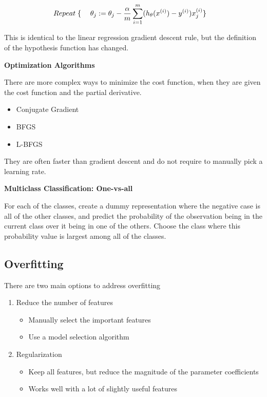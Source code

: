 \documentclass[
]{article}
\begin{document}
\begin{align*} & Repeat \; \lbrace \newline & \; \theta_j := \theta_j - \frac{\alpha}{m} \sum_{i=1}^m (h_\theta(x^{(i)}) - y^{(i)}) x_j^{(i)} \newline & \rbrace \end{align*}

This is identical to the linear regression gradient descent rule, but
the definition of the hypothesis function has changed.

\textbf{Optimization Algorithms}

There are more complex ways to minimize the cost function, when they are
given the cost function and the partial derivative.

\begin{itemize}
\item
  Conjugate Gradient
\item
  BFGS
\item
  L-BFGS
\end{itemize}

They are often faster than gradient descent and do not require to
manually pick a learning rate.

\textbf{Multiclass Classification: One-vs-all}

For each of the classes, create a dummy representation where the
negative case is all of the other classes, and predict the probability
of the observation being in the current class over it being in one of
the others. Choose the class where this probability value is largest
among all of the classes.

\hypertarget{header-n29}{%
\subsection{Overfitting}\label{header-n29}}

There are two main options to address overfitting

\begin{enumerate}
\def\labelenumi{\arabic{enumi}.}
\item
  Reduce the number of features

  \begin{itemize}
  \item
    Manually select the important features
  \item
    Use a model selection algorithm
  \end{itemize}
\item
  Regularization

  \begin{itemize}
  \item
    Keep all features, but reduce the magnitude of the parameter
    coefficients
  \item
    Works well with a lot of slightly useful features
  \end{itemize}
\end{enumerate}
\end{document}
